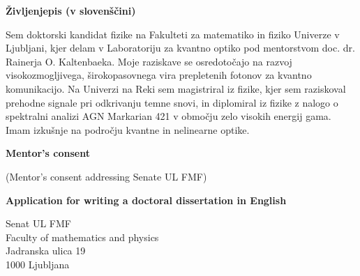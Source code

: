 \documentclass{article}
\theoremstyle{mytheoremstyle}
\theoremstyle{mytheoremstyle}
\theoremstyle{myproblemstyle}
\begin{document}
\vspace{1cm}

\begin{center}
    \textbf{Življenjepis (v slovenščini)}
\end{center}
Sem doktorski kandidat fizike na Fakulteti za matematiko in fiziko Univerze v Ljubljani,
kjer delam v Laboratoriju za kvantno optiko pod mentorstvom doc. dr. Rainerja O. Kaltenbaeka.
Moje raziskave se osredotočajo na razvoj visokozmogljivega, širokopasovnega vira prepletenih fotonov za kvantno komunikacijo.
Na Univerzi na Reki sem magistriral iz fizike, kjer sem raziskoval prehodne signale pri odkrivanju temne snovi,
in diplomiral iz fizike z nalogo o spektralni analizi AGN Markarian 421 v območju zelo visokih energij gama.
Imam izkušnje na področju kvantne in nelinearne optike.



\clearpage
\pagestyle{plain}

\vspace{1cm}

\begin{center}
    \textbf{Mentor's consent}
\end{center}

\vspace{1cm}

\noindent (Mentor's consent addressing Senate UL FMF)


\clearpage
\pagestyle{plain}

\begin{center}
    \textbf{Application for writing a doctoral dissertation in English}\\
\end{center}

\noindent Senat UL FMF\\
    Faculty of mathematics and physics\\
    Jadranska ulica 19\\
    1000 Ljubljana\\
\end{document}
